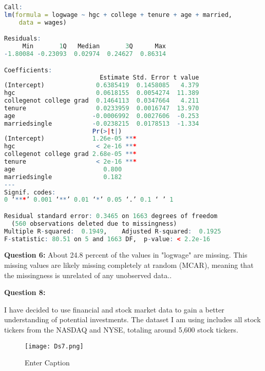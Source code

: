 \documentclass{article}
\begin{document}

\begin{lstlisting}[language=R, caption={Linear Regression Output}]
Call:
lm(formula = logwage ~ hgc + college + tenure + age + married, 
    data = wages)

Residuals:
     Min       1Q   Median       3Q      Max 
-1.80084 -0.23093  0.02974  0.24627  0.86314 

Coefficients:
                          Estimate Std. Error t value
(Intercept)              0.6385419  0.1458085   4.379
hgc                      0.0618155  0.0054274  11.389
collegenot college grad  0.1464113  0.0347664   4.211
tenure                   0.0233959  0.0016747  13.970
age                     -0.0006992  0.0027606  -0.253
marriedsingle           -0.0238215  0.0178513  -1.334
                        Pr(>|t|)    
(Intercept)             1.26e-05 ***
hgc                      < 2e-16 ***
collegenot college grad 2.68e-05 ***
tenure                   < 2e-16 ***
age                        0.800    
marriedsingle              0.182    
---
Signif. codes:  
0 ‘***’ 0.001 ‘**’ 0.01 ‘*’ 0.05 ‘.’ 0.1 ‘ ’ 1

Residual standard error: 0.3465 on 1663 degrees of freedom
  (560 observations deleted due to missingness)
Multiple R-squared:  0.1949,	Adjusted R-squared:  0.1925 
F-statistic: 80.51 on 5 and 1663 DF,  p-value: < 2.2e-16
\end{lstlisting}

\textbf{Question 6:} About 24.8 percent of the values in "logwage" are missing. This missing values are likely missing completely at random (MCAR), meaning that the missingness is unrelated of any unobserved data..

\textbf{Question 8:}

I have decided to use financial and stock market data to gain a better understanding of potential investments. The dataset I am using includes all stock tickers from the NASDAQ and NYSE, totaling around 5,600 stock tickers.

\begin{figure}
    \centering
    \texttt{[image: Ds7.png]} %
    \caption{Enter Caption}
    \label{fig:enter-label}
\end{figure}
\end{document}
